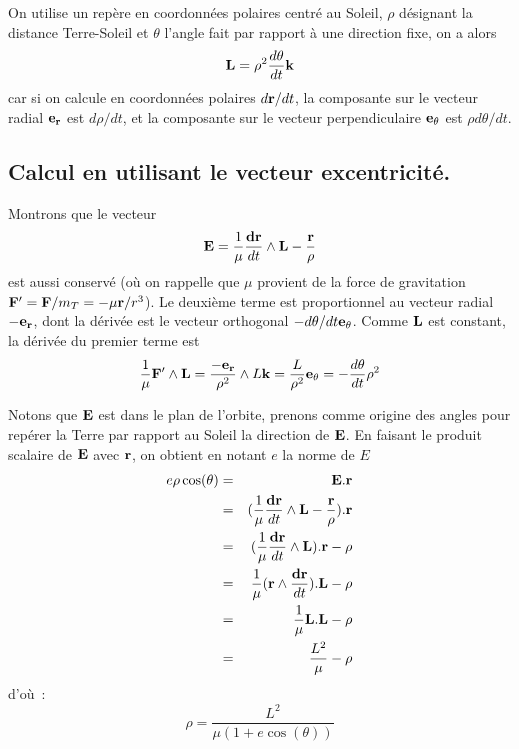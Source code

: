 \documentclass[a4paper,11pt]{book}
\begin{document}
\begin{giacjshere}
On utilise un repère en coordonnées polaires centré au Soleil,
$\rho$ désignant la distance Terre-Soleil et $\theta$ l'angle
fait par rapport à une direction fixe, on a alors
\[ {\bf L} = \rho^2 \frac{d\theta}{dt} {\bf k}\]
car si on calcule en coordonn\'ees polaires $d {\bf r}/dt$,
la composante sur le vecteur radial ${\bf e_r}$ est $d\rho/dt$, et
la composante sur le vecteur perpendiculaire ${\bf e_\theta}$
est $\rho d\theta/dt$.

\subsection{Calcul en utilisant le vecteur excentricit\'e.}
Montrons que le vecteur
\[ {\bf E}= \frac{1}{\mu} \frac{\bf dr}{dt} \wedge {\bf L} - 
\frac{\bf r}{\rho}\]
est aussi conserv\'e (o\`u on rappelle que $\mu$ provient
de la force de gravitation ${\bf F'}={\bf F}/m_T=-\mu {\bf r}/r^3$).
Le deuxi\`eme terme est proportionnel au vecteur
radial $-{\bf e_r}$, dont la d\'eriv\'ee est le vecteur orthogonal
$-d\theta/dt {\bf e_\theta}$.
Comme ${\bf L}$ est constant, la d\'eriv\'ee du premier terme est
\[ \frac{1}{\mu} {\bf F'} \wedge {\bf L} = \frac{\bf -e_r}{\rho^2} \wedge L {\bf k}
= \frac{L}{\rho^2} {\bf e_\theta} = - \frac{d\theta}{dt} \rho^2\]

Notons que ${\bf E}$ est dans le plan de l'orbite, prenons comme origine
des angles pour rep\'erer la Terre par rapport au Soleil la direction
de ${\bf E}$. En faisant le produit scalaire de ${\bf E}$ avec ${\bf r}$, 
on obtient en notant $e$ la norme de $E$
\begin{eqnarray*} e \rho \cos(\theta) &=&  {\bf E}.{\bf r} \\
& = &  (\frac{1}{\mu} \frac{\bf dr}{dt} \wedge {\bf L}- 
\frac{\bf r}{\rho}) .{\bf r} 
\\
& = & (\frac{1}{\mu} \frac{\bf dr}{dt} \wedge {\bf L}).{\bf r}
- \rho \\
& = & \frac{1}{\mu} ({\bf r} \wedge  \frac{\bf dr}{dt} ).{\bf L} - \rho \\
&= & \frac{1}{\mu} {\bf L}.{\bf L}- \rho \\
&= &\frac{L^2}{\mu} - \rho
\end{eqnarray*}
d'o\`u~:
\[ \rho = \frac{L^2}{\mu(1+e \cos(\theta))}\]


\end{giacjshere}
\end{document}

